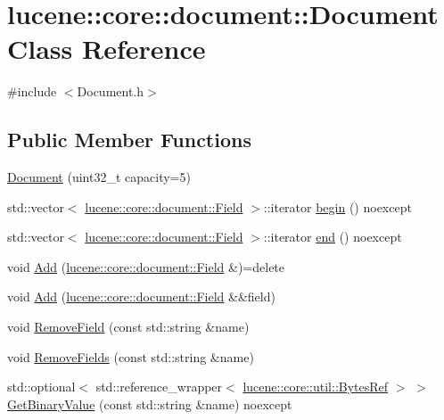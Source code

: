 \hypertarget{classlucene_1_1core_1_1document_1_1Document}{}\section{lucene\+:\+:core\+:\+:document\+:\+:Document Class Reference}
\label{classlucene_1_1core_1_1document_1_1Document}


{\ttfamily \#include $<$Document.\+h$>$}

\subsection*{Public Member Functions}
\begin{DoxyCompactItemize}
\item 
\mbox{\hyperlink{classlucene_1_1core_1_1document_1_1Document_acd273693f28b42b99480204b5177dccc}{Document}} (uint32\+\_\+t capacity=5)
\item 
std\+::vector$<$ \mbox{\hyperlink{classlucene_1_1core_1_1document_1_1Field}{lucene\+::core\+::document\+::\+Field}} $>$\+::iterator \mbox{\hyperlink{classlucene_1_1core_1_1document_1_1Document_a9e2fe1fe52a48c074942095ef62266cc}{begin}} () noexcept
\item 
std\+::vector$<$ \mbox{\hyperlink{classlucene_1_1core_1_1document_1_1Field}{lucene\+::core\+::document\+::\+Field}} $>$\+::iterator \mbox{\hyperlink{classlucene_1_1core_1_1document_1_1Document_ad0a1cb1cadecb670e770ee744a48a619}{end}} () noexcept
\item 
void \mbox{\hyperlink{classlucene_1_1core_1_1document_1_1Document_a0a2a27b34f85668dffba51957c13b02f}{Add}} (\mbox{\hyperlink{classlucene_1_1core_1_1document_1_1Field}{lucene\+::core\+::document\+::\+Field}} \&)=delete
\item 
void \mbox{\hyperlink{classlucene_1_1core_1_1document_1_1Document_a2cc46edf9624c9329c2dec16a4647983}{Add}} (\mbox{\hyperlink{classlucene_1_1core_1_1document_1_1Field}{lucene\+::core\+::document\+::\+Field}} \&\&field)
\item 
void \mbox{\hyperlink{classlucene_1_1core_1_1document_1_1Document_a20e7e07a35682bb94c77b6e1dc0f0a8a}{Remove\+Field}} (const std\+::string \&name)
\item 
void \mbox{\hyperlink{classlucene_1_1core_1_1document_1_1Document_a151221f80667ee317ca8db358e4052e2}{Remove\+Fields}} (const std\+::string \&name)
\item 
std\+::optional$<$ std\+::reference\+\_\+wrapper$<$ \mbox{\hyperlink{classlucene_1_1core_1_1util_1_1BytesRef}{lucene\+::core\+::util\+::\+Bytes\+Ref}} $>$ $>$ \mbox{\hyperlink{classlucene_1_1core_1_1document_1_1Document_a3ec2c17e86ca5895821fb03f155c9d50}{Get\+Binary\+Value}} (const std\+::string \&name) noexcept

\end{DoxyCompactItemize}
